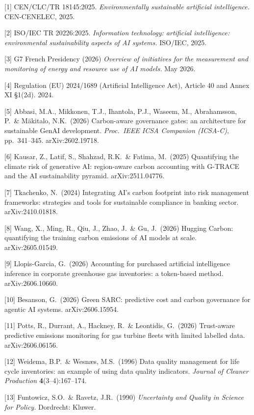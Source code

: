 \documentclass{article}
\begin{document}
\small

[1] CEN/CLC/TR 18145:2025. {\it Environmentally sustainable artificial
intelligence.} CEN-CENELEC, 2025.

[2] ISO/IEC TR 20226:2025. {\it Information technology: artificial
intelligence: environmental sustainability aspects of AI systems.} ISO/IEC,
2025.

[3] G7 French Presidency (2026) {\it Overview of initiatives for the
measurement and monitoring of energy and resource use of AI models.} May 2026.

[4] Regulation (EU) 2024/1689 (Artificial Intelligence Act), Article 40 and
Annex XI \S1(2d). 2024.

[5] Abbasi, M.A., Mikkonen, T.J., Ihantola, P.J., Waseem, M., Abrahamsson,
P.\ \& M\"akitalo, N.K.\ (2026) Carbon-aware governance gates: an architecture
for sustainable GenAI development. {\it Proc.\ IEEE ICSA Companion (ICSA-C)},
pp.\ 341--345. arXiv:2602.19718.

[6] Kausar, Z., Latif, S., Shahzad, R.K.\ \& Fatima, M.\ (2025) Quantifying
the climate risk of generative AI: region-aware carbon accounting with G-TRACE
and the AI sustainability pyramid. arXiv:2511.04776.

[7] Tkachenko, N.\ (2024) Integrating AI's carbon footprint into risk
management frameworks: strategies and tools for sustainable compliance in
banking sector. arXiv:2410.01818.

[8] Wang, X., Ming, R., Qiu, J., Zhao, J.\ \& Gu, J.\ (2026) Hugging Carbon:
quantifying the training carbon emissions of AI models at scale.
arXiv:2605.01549.

[9] Llopis-Garcia, G.\ (2026) Accounting for purchased artificial intelligence
inference in corporate greenhouse gas inventories: a token-based method.
arXiv:2606.10660.

[10] Besanson, G.\ (2026) Green SARC: predictive cost and carbon governance
for agentic AI systems. arXiv:2606.15954.

[11] Potts, R., Durrant, A., Hackney, R.\ \& Leontidis, G.\ (2026)
Trust-aware predictive emissions monitoring for gas turbine fleets with limited
labelled data. arXiv:2606.06156.

[12] Weidema, B.P.\ \& Wesn\ae s, M.S.\ (1996) Data quality management for life
cycle inventories: an example of using data quality indicators. {\it Journal of
Cleaner Production} {\bf 4}(3--4):167--174.

[13] Funtowicz, S.O.\ \& Ravetz, J.R.\ (1990) {\it Uncertainty and Quality in
Science for Policy.} Dordrecht: Kluwer.
\end{document}
